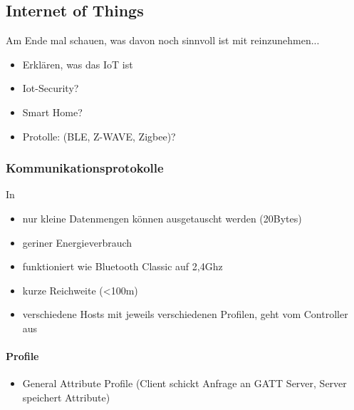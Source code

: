 \subsection{Internet of Things}
\label{sec:sota_iot}
Am Ende mal schauen, was davon noch sinnvoll ist mit reinzunehmen... 
\begin{itemize}
    \item Erklären, was das IoT ist
    \item Iot-Security?
    \item Smart Home?
    \item Protolle: (BLE, Z-WAVE, Zigbee)?
\end{itemize}

\subsubsection{Kommunikationsprotokolle}
\label{sec:sota_iot_protocols}
    \cite{Gomez2012}
    In \cite{Rose2016}
    \begin{itemize}
        \item nur kleine Datenmengen können ausgetauscht werden (20Bytes)\cite{Rose2016}
        \item geriner Energieverbrauch
        \item funktioniert wie Bluetooth Classic auf 2,4Ghz
        \item kurze Reichweite (<100m)
        \item verschiedene Hosts mit jeweils verschiedenen Profilen, geht vom Controller aus
    \end{itemize}
    
    \paragraph{Profile}\cite{Rose2016}
        \begin{itemize}
            \item General Attribute Profile (Client schickt Anfrage an GATT Server, Server speichert Attribute)
        \end{itemize}
